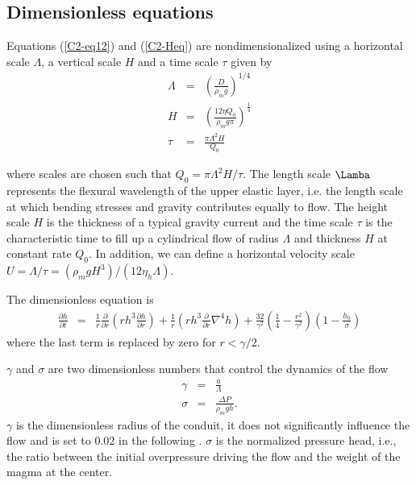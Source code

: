 \subsection{Dimensionless equations}
\label{C2-sec:dimens-equat}

Equations  (\ref{C2-eq12}) and  (\ref{C2-Heq}) are  nondimensionalized
using a  horizontal scale $\Lambda$, a  vertical scale $H$ and  a time
scale $\tau$ given by
\begin{eqnarray}
  \Lambda &=& \left(\frac{D}{\rho_m g}\right)^{1/4}\label{L1}\\
  H&=&\left       (\frac{12\eta      Q_{0}}{\rho_{m}g       \pi}\right      )
       ^{\frac{1}{4}} \label{H1}\\
  \tau&=&\frac{\pi \Lambda^{2} H}{Q_{0}}\label{T1}
\end{eqnarray}

where scales  are chosen  such that $Q_0  = \pi\Lambda^2  H/\tau$. The
length scale $\Lamba$ represents the  flexural wavelength of the upper
elastic layer,  i.e. the  length scale at  which bending  stresses and
gravity  contributes equally  to flow.   The height  scale $H$  is the
thickness of  a typical gravity current  and the time scale  $\tau$ is
the  characteristic time  to  fill  up a  cylindrical  flow of  radius
$\Lambda$ and thickness  $H$ at constant rate $Q_0$.   In addition, we
can       define        a       horizontal        velocity       scale
$U=\Lambda/\tau=\left(\rho_m           g           H^3\right)/\left(12
  \eta_h\Lambda\right)$.

The dimensionless equation is
\begin{eqnarray}
  \frac{\partial h}{\partial t}& =&\frac{1}{ r}
                                    \frac{\partial}{\partial r}  \left( rh^3  \frac{\partial h}{\partial
                                    r}\right)+\frac{1}{ r} \left( rh^3 \frac{\partial}{\partial r}\nabla^4h\right)+
                                    \frac{32}{\gamma^{2}}\left(\frac{1}{4}-\frac{r^{2}}{\gamma^{2}}\right)\left(1-\frac{h_0}{\sigma}\right)
\end{eqnarray}
where the last term is replaced by zero for $r<\gamma/2$.

$\gamma$ and $\sigma$  are two dimensionless numbers  that control the
dynamics of the flow
\begin{eqnarray}
  \gamma &=& \frac{a}{\Lambda}\\
  \sigma &=& \frac{\Delta P}{\rho_m g h}.
\end{eqnarray}
$\gamma$  is the  dimensionless radius  of  the conduit,  it does  not
significantly influence the flow and is set to $0.02$ in the following
\citep{Michaut:2009jx,Michaut:2011kg}.   $\sigma$  is  the  normalized
pressure  head,  i.e.,  the  ratio between  the  initial  overpressure
driving the flow and the weight of the magma at the center.
	 
